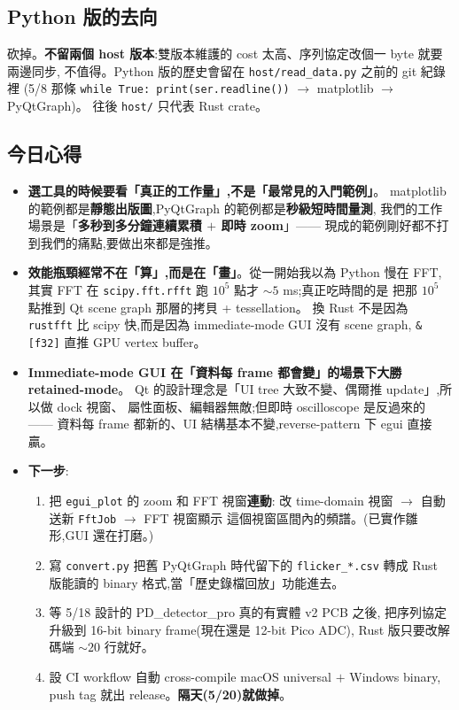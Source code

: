 \subsection*{Python 版的去向}

砍掉。\textbf{不留兩個 host 版本}:雙版本維護的 cost 太高、序列協定改個一 byte 就要兩邊同步,
不值得。Python 版的歷史會留在 \texttt{host/read\_data.py} 之前的 git 紀錄裡
(5/8 那條 \texttt{while True: print(ser.readline())} \(\to\) matplotlib \(\to\) PyQtGraph)。
往後 \texttt{host/} 只代表 Rust crate。

\subsection*{今日心得}

\begin{itemize}[leftmargin=2em,itemsep=0pt]
  \item \textbf{選工具的時候要看「真正的工作量」,不是「最常見的入門範例」}。
        matplotlib 的範例都是\textbf{靜態出版圖},PyQtGraph 的範例都是\textbf{秒級短時間量測},
        我們的工作場景是「\textbf{多秒到多分鐘連續累積 \(+\) 即時 zoom}」——
        現成的範例剛好都不打到我們的痛點,要做出來都是強推。
  \item \textbf{效能瓶頸經常不在「算」,而是在「畫」}。從一開始我以為 Python 慢在 FFT,
        其實 FFT 在 \texttt{scipy.fft.rfft} 跑 \(10^5\) 點才 \(\sim 5\) ms;真正吃時間的是
        把那 \(10^5\) 點推到 Qt scene graph 那層的拷貝 + tessellation。
        換 Rust 不是因為 \texttt{rustfft} 比 scipy 快,而是因為 immediate-mode GUI 沒有 scene graph,
        \texttt{\&[f32]} 直推 GPU vertex buffer。
  \item \textbf{Immediate-mode GUI 在「資料每 frame 都會變」的場景下大勝 retained-mode}。
        Qt 的設計理念是「UI tree 大致不變、偶爾推 update」,所以做 dock 視窗、
        屬性面板、編輯器無敵;但即時 oscilloscope 是反過來的 ——
        資料每 frame 都新的、UI 結構基本不變,reverse-pattern 下 egui 直接贏。
  \item \textbf{下一步}:
        \begin{enumerate}[leftmargin=2em,itemsep=0pt]
          \item 把 \texttt{egui\_plot} 的 zoom 和 FFT 視窗\textbf{連動}:
                改 time-domain 視窗 \(\to\) 自動送新 \texttt{FftJob} \(\to\) FFT 視窗顯示
                這個視窗區間內的頻譜。(已實作雛形,GUI 還在打磨。)
          \item 寫 \texttt{convert.py} 把舊 PyQtGraph 時代留下的 \texttt{flicker\_*.csv}
                轉成 Rust 版能讀的 binary 格式,當「歷史錄檔回放」功能進去。
          \item 等 5/18 設計的 PD\_detector\_pro 真的有實體 v2 PCB 之後,
                把序列協定升級到 16-bit binary frame(現在還是 12-bit Pico ADC),
                Rust 版只要改解碼端 \(\sim 20\) 行就好。
          \item 設 CI workflow 自動 cross-compile macOS universal \(+\) Windows binary,
                push tag 就出 release。\textbf{隔天(5/20)就做掉}。
        \end{enumerate}
\end{itemize}
